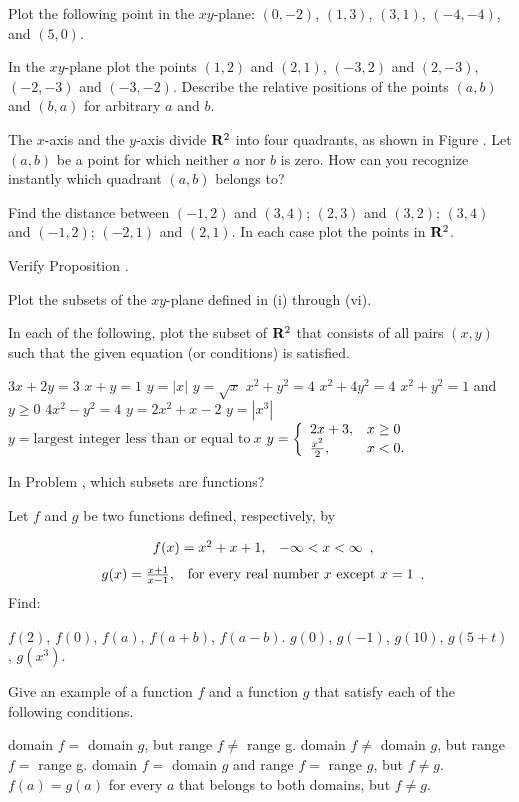 \begin{exercises}
Plot the following point in the $xy$-plane:
$(0, -2)$, $(1, 3)$, $(3, 1)$, $(-4, -4)$, and $(5, 0)$.

In the $xy$-plane plot the points $(1, 2)$ and $(2, 1)$, $(-3, 2)$ and $(2, -3)$, 
$(-2, -3)$ and $(-3, -2)$.
Describe the relative positions of the points $(a, b)$ and $(b, a)$
for arbitrary $a$ and $b$.

The $x$-axis and the $y$-axis divide $\mathrm{\bf R}^2$ into four quadrants, as shown in
Figure .  Let $(a, b)$ be a point for which neither $a$ nor $b$ is zero.
How can you recognize instantly which quadrant $(a, b)$ belongs to?

Find the distance between
$(-1, 2)$ and  $(3, 4)$; 
$(2,3)$ and  $(3,2)$; 
$(3,4)$ and  $(-1,2)$;
$(-2,1)$ and  $(2,1)$.
In each case plot the points in $\mathrm{\bf R}^2$.

Verify Proposition .

Plot the subsets of the $xy$-plane defined in (i) through (vi).

In each of the following, plot the subset of $\mathrm{\bf R}^2$ that consists of all pairs $(x, y)$
such that the given equation (or conditions) is satisfied.
\begin{exenum}
\sx
$3x + 2y = 3$
\sx
$x + y = 1$
\sx
$y = |x|$
\sx
$y = \sqrt x$
\sx
$x^2 + y^2 = 4$
\sx
$x^2 + 4y^2 = 4$
\sx
$x^2 + y^2 = 1$ and $y \geq 0$
\sx
$4x^2 - y^2 = 4$
\sx
$y = 2x^2 + x - 2$
\sx
$y = |x^3|$
\sx
$y = \mbox{largest integer less than or equal to}\ x$ 
\sx
$y = \left\{ \begin{array}{ll} 2x + 3, & x \geq 0 \\ \frac{x^2}{2}, & x < 0. \end{array} \right.$
\end{exenum}

In Problem , which subsets are functions?

Let $f$ and $g$ be two functions defined, respectively, by

\[
\begin{array}{ll} f(x)= x^2 + x + 1, &  -\infty < x < \infty \end{array}
,
\]
\[
\begin{array}{ll} g(x)= \frac{x + 1}{x - 1}, & \mbox{for every real number $x$ except $x=1$} \end{array}
.
\]
Find:
\begin{exenum}
\sx
$f(2)$, $f(0)$, $f(a)$, $f(a + b)$, $f(a - b)$.
\sx
$g(0)$, $g(-1)$, $g(10)$, $g(5 + t)$, $g(x^3)$.
\end{exenum}

Give an example of a function $f$ and a function $g$ that satisfy
each of the following conditions.
\begin{exenum}
\sx
domain $f =$ domain $g$, but range $f \ne$ range g.
\sx
domain $f \ne$ domain $g$, but range $f =$ range g.
\sx
domain $f =$ domain $g$ and range $f =$ range $g$, but $f \ne g$.
\sx
$f(a) = g(a)$ for every $a$ that belongs to both domains, but $f \ne g$.
\end{exenum}


\end{exercises}
